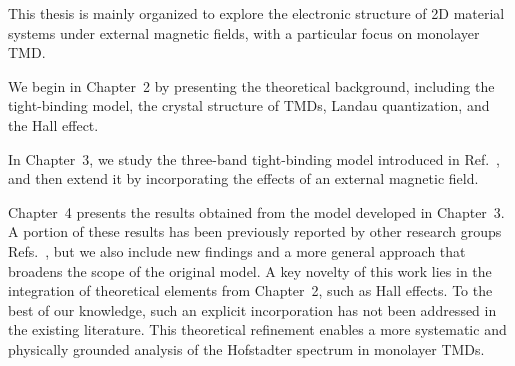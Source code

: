 This thesis is mainly organized to explore the electronic structure of \ac{2D} material systems under external magnetic fields, with a particular focus on monolayer \ac{TMD}. 

We begin in Chapter~2 by presenting the theoretical background, including the tight-binding model, the crystal structure of \acp{TMD}, Landau quantization, and the Hall effect.

In Chapter~3, we study the three-band tight-binding model introduced in Ref.~\cite{PhysRevB.88.085433}, and then extend it by incorporating the effects of an external magnetic field.

Chapter~4 presents the results obtained from the model developed in Chapter~3. A portion of these results has been previously reported by other research groups Refs.~\cite{ho2014,ho2015}, but we also include new findings and a more general approach that broadens the scope of the original model. A key novelty of this work lies in the integration of theoretical elements from Chapter~2, such as Hall effects. To the best of our knowledge, such an explicit incorporation has not been addressed in the existing literature. This theoretical refinement enables a more systematic and physically grounded analysis of the Hofstadter spectrum in monolayer \acp{TMD}.



